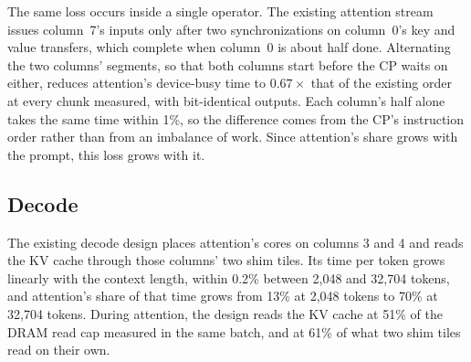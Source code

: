 The same loss occurs inside a single operator.
The existing attention stream issues column~7's inputs only after two synchronizations on column~0's key and value transfers, which complete when column~0 is about half done.
Alternating the two columns' segments, so that both columns start before the CP waits on either, reduces attention's device-busy time to $0.67\times$ that of the existing order at every chunk measured, with bit-identical outputs.
Each column's half alone takes the same time within 1\%, so the difference comes from the CP's instruction order rather than from an imbalance of work.
Since attention's share grows with the prompt, this loss grows with it.

\subsection{Decode}
\label{subsec:loss-decode}

The existing decode design places attention's cores on columns 3 and 4 and reads the KV cache through those columns' two shim tiles.
Its time per token grows linearly with the context length, within 0.2\% between 2{,}048 and 32{,}704 tokens, and attention's share of that time grows from 13\% at 2{,}048 tokens to 70\% at 32{,}704 tokens.
During attention, the design reads the KV cache at 51\% of the DRAM read cap measured in the same batch, and at 61\% of what two shim tiles read on their own.

